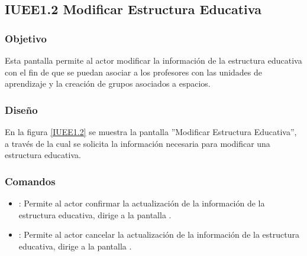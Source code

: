 \subsection{IUEE1.2 Modificar Estructura Educativa}

\subsubsection{Objetivo}
Esta pantalla permite al actor modificar la información de la estructura educativa con el fin de que se puedan asociar a los profesores con las unidades de aprendizaje y la creación de grupos asociados a espacios.

\subsubsection{Diseño}

En la figura \ref{IUEE1.2} se muestra la pantalla ''Modificar Estructura Educativa'', a través de la cual se solicita la información necesaria para modificar una estructura educativa.


\subsubsection{Comandos}
\begin{itemize}
	\item {}: Permite al actor confirmar la actualización de la información de la estructura educativa, dirige a la pantalla .
	
	\item {}: Permite al actor cancelar la actualización de la información de la estructura educativa, dirige a la pantalla .
\end{itemize}
